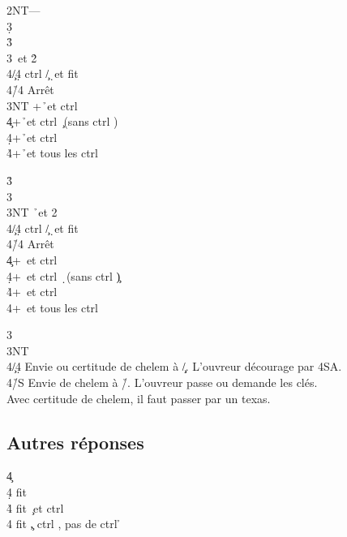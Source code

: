 \documentclass[a4paper]{article}
\begin{document}
\begin{bidtable}
2NT---\\
3\d\+\\
3\h {}\h \\
3\s {}\s\ et 2\h \+\\
4\c/4\d \> ctrl \c /\d\ et fit \s \\
4\h/4\s \> Arrêt\-\\
3NT +\h\ et ctrl \s \\
4\c {}+\h\ et ctrl \c\ (sans ctrl \s )\\
4\d {}+\h\ et ctrl \d \\
4\h {}+\h\ et tous les ctrl\-
\end{bidtable}

\begin{bidtable}
3\h\+\\
3\s {}\s \\
3NT \h\ et 2\s \+\\
4\c/4\d \> ctrl \c /\d\ et fit \h \\
4\h/4\s \> Arrêt\-\\
4\c {}+\s\ et ctrl \c \\
4\d {}+\s\ et ctrl \d\ (sans ctrl \c )\\
4\h {}+\s\ et ctrl \h \\
4\s {}+\s\ et tous les ctrl\-
\end{bidtable}

\begin{bidtable}
3\s\+\\
3NT\+\\
4\c/4\d \> Envie ou certitude de chelem à \c /\d . L'ouvreur décourage par 4SA.\\
4\h/S \> Envie de chelem à \h /\s . L'ouvreur passe ou demande les clés.\\
\>Avec certitude de chelem, il faut passer par un texas.\-\-
\end{bidtable}

\subsection{Autres réponses}

\begin{bidtable}
4\c\+\\
4\d \> fit \d \\
4\h \> fit \c\ et ctrl \h \\
4\s \> fit \c , ctrl \s , pas de ctrl \h \-
\end{bidtable}
\end{document}
